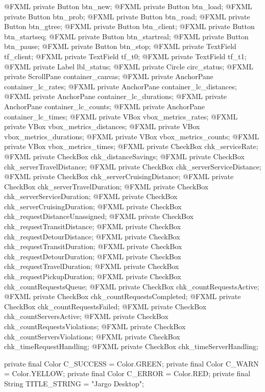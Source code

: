 \nwenddocs{}\plusendmoddef
@FXML private Button btn_new;
@FXML private Button btn_load;
@FXML private Button btn_prob;
@FXML private Button btn_road;
@FXML private Button btn_gtree;
@FXML private Button btn_client;
@FXML private Button btn_startseq;
@FXML private Button btn_startreal;
@FXML private Button btn_pause;
@FXML private Button btn_stop;
@FXML private TextField tf_client;
@FXML private TextField tf_t0;
@FXML private TextField tf_t1;
@FXML private Label lbl_status;
@FXML private Circle circ_status;
@FXML private ScrollPane container_canvas;
@FXML private AnchorPane container_lc_rates;
@FXML private AnchorPane container_lc_distances;
@FXML private AnchorPane container_lc_durations;
@FXML private AnchorPane container_lc_counts;
@FXML private AnchorPane container_lc_times;
@FXML private VBox vbox_metrics_rates;
@FXML private VBox vbox_metrics_distances;
@FXML private VBox vbox_metrics_durations;
@FXML private VBox vbox_metrics_counts;
@FXML private VBox vbox_metrics_times;
@FXML private CheckBox chk_serviceRate;
@FXML private CheckBox chk_distanceSavings;
@FXML private CheckBox chk_serverTravelDistance;
@FXML private CheckBox chk_serverServiceDistance;
@FXML private CheckBox chk_serverCruisingDistance;
@FXML private CheckBox chk_serverTravelDuration;
@FXML private CheckBox chk_serverServiceDuration;
@FXML private CheckBox chk_serverCruisingDuration;
@FXML private CheckBox chk_requestDistanceUnassigned;
@FXML private CheckBox chk_requestTransitDistance;
@FXML private CheckBox chk_requestDetourDistance;
@FXML private CheckBox chk_requestTransitDuration;
@FXML private CheckBox chk_requestDetourDuration;
@FXML private CheckBox chk_requestTravelDuration;
@FXML private CheckBox chk_requestPickupDuration;
@FXML private CheckBox chk_countRequestsQueue;
@FXML private CheckBox chk_countRequestsActive;
@FXML private CheckBox chk_countRequestsCompleted;
@FXML private CheckBox chk_countRequestsFailed;
@FXML private CheckBox chk_countServersActive;
@FXML private CheckBox chk_countRequestsViolations;
@FXML private CheckBox chk_countServersViolations;
@FXML private CheckBox chk_timeRequestHandling;
@FXML private CheckBox chk_timeServerHandling;
\nwendcode{}\nwdocspar

\nwenddocs{}\plusendmoddef
private final Color C_SUCCESS = Color.GREEN;
private final Color C_WARN = Color.YELLOW;
private final Color C_ERROR = Color.RED;
private final String TITLE_STRING = "Jargo Desktop";
\nwendcode{}\nwdocspar

